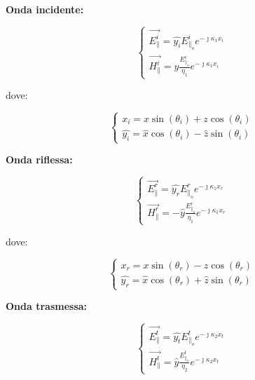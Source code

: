 \textbf{Onda incidente:} 

{\Large \begin{equation}
    \begin{cases}
        \vec{E_\parallel^{i}} = \hat{y_i} E_{\parallel_o}^{i} e^{-\jmath \kappa_1 x_i} \\ 
        \vec{H_\parallel^{i}} = \hat{y} \frac{E_{\parallel_o}^{i}}{\eta_1} e^{-\jmath \kappa_1 x_i}
    \end{cases}
\end{equation}} 

dove: 

{\Large \begin{equation}
    \begin{cases}
        x_i = x \sin(\theta_i) + z \cos(\theta_i) \\ 
        \hat{y_i} = \hat{x} \cos(\theta_i) - \hat{z} \sin(\theta_i)        
    \end{cases}
\end{equation}}

\textbf{Onda riflessa:} 

{\Large \begin{equation}
    \begin{cases}
        \vec{E_\parallel^{r}} = \hat{y_r} E_{\parallel_o}^{r} e^{-\jmath \kappa_1 x_r} \\ 
        \vec{H_\parallel^{r}} = - \hat{y} \frac{E_{\parallel_o}^{r}}{\eta_1} e^{-\jmath \kappa_1 x_r}
    \end{cases}
\end{equation}} 

dove: 

{\Large \begin{equation}
    \begin{cases}
        x_r = x \sin(\theta_r) - z \cos(\theta_r) \\ 
        \hat{y_r} = \hat{x} \cos(\theta_r) + \hat{z} \sin(\theta_r)        
    \end{cases}
\end{equation}}


\textbf{Onda trasmessa:} 

{\Large \begin{equation}
    \begin{cases}
        \vec{E_\parallel^{t}} = \hat{y_t} E_{\parallel_o}^{t} e^{-\jmath \kappa_2 x_t} \\ 
        \vec{H_\parallel^{t}} = \hat{y} \frac{E_{\parallel_o}^{t}}{\eta_2} e^{-\jmath \kappa_2 x_t}
    \end{cases}
\end{equation}} 

